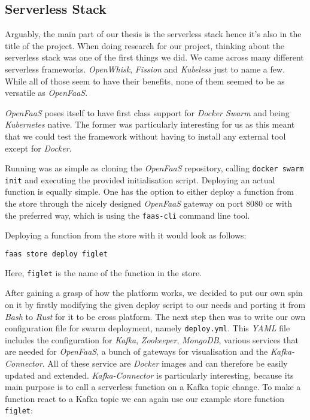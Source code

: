 \subsection{Serverless Stack}

Arguably, the main part of our thesis is the serverless stack hence it's also in the title of the
project. When doing research for our project, thinking about the serverless stack was one of the
first things we did. We came across many different serverless frameworks. \textit{OpenWhisk},
\textit{Fission} and \textit{Kubeless} just to name a few. While all of those seem to have their
benefits, none of them seemed to be as versatile as \textit{OpenFaaS}.

\textit{OpenFaaS} poses itself to have first class support for \textit{Docker Swarm} and being
\textit{Kubernetes} native. The former was particularly interesting for us as this meant that we
could test the framework without having to install any external tool except for  \textit{Docker}.

Running was as simple as cloning the \textit{OpenFaaS} repository, calling \texttt{docker swarm
init} and executing the provided initialisation script. Deploying an actual function is equally
simple. One has the option to either deploy a function from the store through the nicely designed
\textit{OpenFaaS} gateway on port 8080 or with the preferred way, which is using the
\texttt{faas-cli} command line tool.

Deploying a function from the store with it would look as follows:

\begin{lstlisting}[language=bash]
faas store deploy figlet
\end{lstlisting}

Here, \texttt{figlet} is the name of the function in the store.

After gaining a grasp of how the platform works, we decided to put our own spin on it by firstly
modifying the given deploy script to our needs and porting it from \textit{Bash} to \textit{Rust}
for it to be cross platform. The next step then was to write our own configuration file for swarm
deployment, namely \texttt{deploy.yml}. This \textit{YAML} file includes the configuration for
\textit{Kafka}, \textit{Zookeeper}, \textit{MongoDB}, various services that are needed for
\textit{OpenFaaS}, a bunch of gateways for visualisation and the \textit{Kafka-Connector}. All of
these service are \textit{Docker} images and can therefore be easily updated and extended.
\textit{Kafka-Connector} is particularly interesting, because its main purpose is to call a
serverless function on a Kafka topic change. To make a function react to a Kafka topic we can again
use our example store function \texttt{figlet}:

